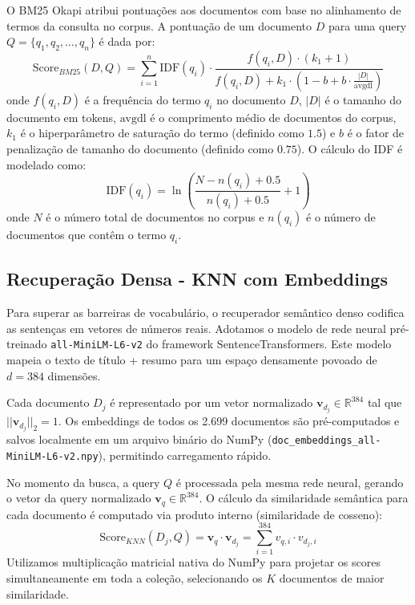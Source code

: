 \documentclass[12pt]{article}
\begin{document}
O BM25 Okapi atribui pontuações aos documentos com base no alinhamento de termos da consulta no corpus. A pontuação de um documento $D$ para uma query $Q = \{q_1, q_2, \dots, q_n\}$ é dada por:
\begin{equation}
    \text{Score}_{BM25}(D, Q) = \sum_{i=1}^{n} \text{IDF}(q_i) \cdot \frac{f(q_i, D) \cdot (k_1 + 1)}{f(q_i, D) + k_1 \cdot \left(1 - b + b \cdot \frac{|D|}{\text{avgdl}}\right)}
\end{equation}
onde $f(q_i, D)$ é a frequência do termo $q_i$ no documento $D$, $|D|$ é o tamanho do documento em tokens, $\text{avgdl}$ é o comprimento médio de documentos do corpus, $k_1$ é o hiperparâmetro de saturação do termo (definido como $1.5$) e $b$ é o fator de penalização de tamanho do documento (definido como $0.75$). O cálculo do IDF é modelado como:
\begin{equation}
    \text{IDF}(q_i) = \ln \left( \frac{N - n(q_i) + 0.5}{n(q_i) + 0.5} + 1 \right)
\end{equation}
onde $N$ é o número total de documentos no corpus e $n(q_i)$ é o número de documentos que contêm o termo $q_i$.

\subsection{Recuperação Densa - KNN com Embeddings}

Para superar as barreiras de vocabulário, o recuperador semântico denso codifica as sentenças em vetores de números reais. Adotamos o modelo de rede neural pré-treinado \texttt{all-MiniLM-L6-v2} do framework SentenceTransformers. Este modelo mapeia o texto de título + resumo para um espaço densamente povoado de $d = 384$ dimensões.

Cada documento $D_j$ é representado por um vetor normalizado $\mathbf{v}_{d_j} \in \mathbb{R}^{384}$ tal que $||\mathbf{v}_{d_j}||_2 = 1$. Os embeddings de todos os 2.699 documentos são pré-computados e salvos localmente em um arquivo binário do NumPy (\texttt{doc\_embeddings\_all-MiniLM-L6-v2.npy}), permitindo carregamento rápido.

No momento da busca, a query $Q$ é processada pela mesma rede neural, gerando o vetor da query normalizado $\mathbf{v}_q \in \mathbb{R}^{384}$. O cálculo da similaridade semântica para cada documento é computado via produto interno (similaridade de cosseno):
\begin{equation}
    \text{Score}_{KNN}(D_j, Q) = \mathbf{v}_q \cdot \mathbf{v}_{d_j} = \sum_{i=1}^{384} v_{q, i} \cdot v_{d_j, i}
\end{equation}
Utilizamos multiplicação matricial nativa do NumPy para projetar os scores simultaneamente em toda a coleção, selecionando os $K$ documentos de maior similaridade.
\end{document}
